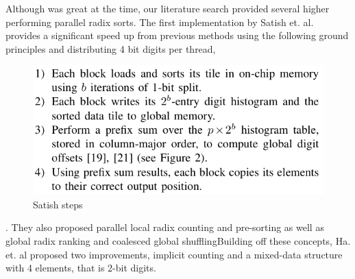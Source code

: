 \documentclass{article}
\begin{document}
Although \citep{zagharadixvector} was great at the time, our literature search provided several higher performing parallel radix sorts. The first implementation by Satish et. al. provides a significant speed up from previous methods using the following ground principles and distributing 4 bit digits per thread, 
\begin{figure} [H]
    \centering
    \includegraphics[width=\linewidth]{satish.PNG}
    \caption{Satish steps \citep{satish}}
    \label{fig:enter-label}
\end{figure}.
They also proposed parallel local radix counting and pre-sorting as well as global radix ranking and coalesced global shuffling\citep{satish}Building off these concepts, Ha. et. al proposed two improvements, implicit counting and a mixed-data structure with 4 elements, that is 2-bit digits.
\end{document}

